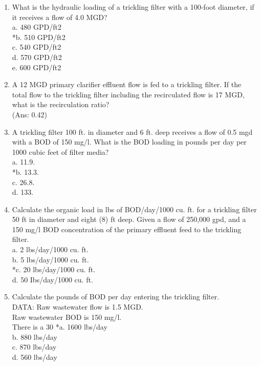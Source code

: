 \begin{enumerate}
\item  What is the hydraulic loading of a trickling filter with a 100-foot diameter, if it receives a flow of 4.0 MGD? \\

 a. 480 GPD/ft2 \\
 *b. 510 GPD/ft2 \\
 c. 540 GPD/ft2 \\
 d. 570 GPD/ft2 \\
 e. 600 GPD/ft2 \\


\item  A 12 MGD primary clarifier effluent flow is fed to a trickling filter. If the total flow to the trickling filter including the recirculated flow is 17 MGD, what is the recirculation ratio? \\ (Ans: 0.42)

\item  A trickling filter 100  ft. in diameter and 6 ft. deep receives a flow of 0.5 mgd with  a BOD of 150 mg/l.  What is the BOD loading in pounds per day per 1000 cubic feet of filter media? \\

 a. 11.9. \\
 *b. 13.3. \\
 c. 26.8. \\
 d. 133. \\


\item  Calculate the organic load in lbs of BOD/day/1000 cu. ft. for a trickling filter 50 ft in diameter and eight (8) ft deep.  Given a flow of 250,000 gpd, and a 150 mg/l BOD concentration of the primary effluent feed to the trickling filter. \\

 a. 2 lbs/day/1000 cu. ft. \\
 b. 5 lbs/day/1000 cu. ft. \\
 *c. 20 lbs/day/1000 cu. ft. \\
 d. 50 Ibs/day/1000 cu. ft. \\


\item  Calculate the pounds of BOD per day entering the trickling filter.\\
 DATA: Raw wastewater flow is 1.5 MGD.\\
 Raw wastewater BOD is 150 mg/l.\\
 There is a 30%
 *a. 1600 lbs/day \\
 b. 880 lbs/day \\
 c. 870 lbs/day \\
 d. 560 lbs/day \\



\end{enumerate}
